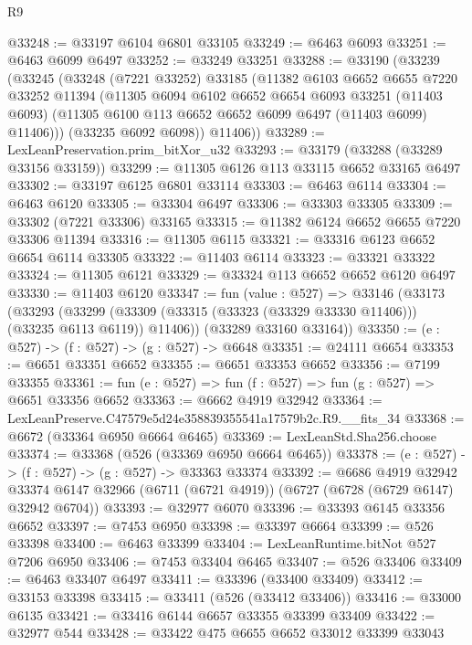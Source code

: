 \begin{lexlean}{R9}
\begin{coremodule}
@33248 := @33197 @6104 @6801 @33105
@33249 := @6463 @6093
@33251 := @6463 @6099 @6497
@33252 := @33249 @33251
@33288 := @33190
    (@33239
      (@33245
        (@33248
          (@7221 @33252)
          @33185
          (@11382
            @6103
            @6652
            @6655
            @7220
            @33252
            @11394
            (@11305
              @6094
              @6102
              @6652
              @6654
              @6093
              @33251
              (@11403 @6093)
              (@11305 @6100 @113 @6652 @6652 @6099 @6497 (@11403 @6099) @11406)))
          (@33235 @6092 @6098))
        @11406))
@33289 := LexLeanPreservation.prim_bitXor_u32
@33293 := @33179 (@33288 (@33289 @33156 @33159))
@33299 := @11305 @6126 @113 @33115 @6652 @33165 @6497
@33302 := @33197 @6125 @6801 @33114
@33303 := @6463 @6114
@33304 := @6463 @6120
@33305 := @33304 @6497
@33306 := @33303 @33305
@33309 := @33302 (@7221 @33306) @33165
@33315 := @11382 @6124 @6652 @6655 @7220 @33306 @11394
@33316 := @11305 @6115
@33321 := @33316 @6123 @6652 @6654 @6114 @33305
@33322 := @11403 @6114
@33323 := @33321 @33322
@33324 := @11305 @6121
@33329 := @33324 @113 @6652 @6652 @6120 @6497
@33330 := @11403 @6120
@33347 := fun (value : @527) =>
  @33146
    (@33173
      (@33293
        (@33299 (@33309 (@33315 (@33323 (@33329 @33330 @11406))) (@33235 @6113 @6119)) @11406))
      (@33289 @33160 @33164))
@33350 := (e : @527) -> (f : @527) -> (g : @527) -> @6648
@33351 := @24111 @6654
@33353 := @6651 @33351 @6652
@33355 := @6651 @33353 @6652
@33356 := @7199 @33355
@33361 := fun (e : @527) => fun (f : @527) => fun (g : @527) => @6651 @33356 @6652
@33363 := @6662 @4919 @32942
@33364 := LexLeanPreserve.C47579e5d24e358839355541a17579b2c.R9.__fits_34
@33368 := @6672 (@33364 @6950 @6664 @6465)
@33369 := LexLeanStd.Sha256.choose
@33374 := @33368 (@526 (@33369 @6950 @6664 @6465))
@33378 := (e : @527) -> (f : @527) -> (g : @527) -> @33363 @33374
@33392 := @6686
    @4919
    @32942
    @33374
    @6147
    @32966
    (@6711 (@6721 @4919))
    (@6727 (@6728 (@6729 @6147) @32942 @6704))
@33393 := @32977 @6070
@33396 := @33393 @6145 @33356 @6652
@33397 := @7453 @6950
@33398 := @33397 @6664
@33399 := @526 @33398
@33400 := @6463 @33399
@33404 := LexLeanRuntime.bitNot @527 @7206 @6950
@33406 := @7453 @33404 @6465
@33407 := @526 @33406
@33409 := @6463 @33407 @6497
@33411 := @33396 (@33400 @33409)
@33412 := @33153 @33398
@33415 := @33411 (@526 (@33412 @33406))
@33416 := @33000 @6135
@33421 := @33416 @6144 @6657 @33355 @33399 @33409
@33422 := @32977 @544
@33428 := @33422 @475 @6655 @6652 @33012 @33399 @33043

\end{coremodule}
\end{lexlean}
